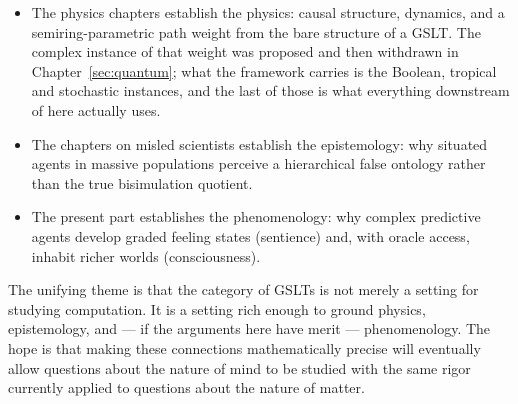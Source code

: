 \begin{itemize}[itemsep=4pt]
  \item The physics chapters establish the
        physics: causal structure, dynamics, and a semiring-parametric
        path weight from the bare structure of a GSLT.
        The complex instance of that weight was proposed and then
        withdrawn in Chapter~\ref{sec:quantum}; what the framework
        carries is the Boolean, tropical and stochastic instances,
        and the last of those is what everything downstream of here
        actually uses.

  \item The chapters on misled scientists establish the epistemology:
        why situated agents in massive populations perceive a
        hierarchical false ontology rather than the true bisimulation
        quotient.

  \item The present part establishes the phenomenology:
        why complex predictive agents develop graded feeling states
        (sentience) and, with oracle access, inhabit richer worlds
        (consciousness).
\end{itemize}

The unifying theme is that the category of GSLTs is not merely
a setting for studying computation.
It is a setting rich enough to ground physics, epistemology, and
--- if the arguments here have merit --- phenomenology.
The hope is that making these connections mathematically precise
will eventually allow questions about the nature of mind to be
studied with the same rigor currently applied to questions about
the nature of matter.

